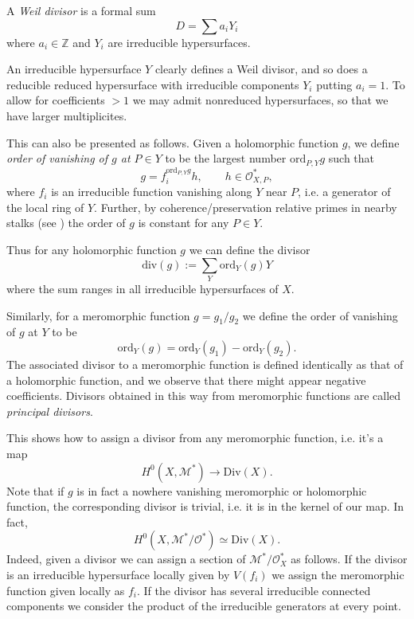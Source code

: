 \documentclass{book}
\begin{document}
\begin{definition}
\label{definition-divisor}
A {\it Weil divisor} is a formal sum
$$
D=\sum a_i Y_i
$$
where $a_i\in \mathbb{Z}$ and $Y_i$ are
irreducible hypersurfaces.
\end{definition}

\noindent
An irreducible hypersurface $Y$ clearly
defines a Weil divisor,
and so does a reducible reduced hypersurface
with irreducible
components $Y_i$ putting $a_i=1$.
To allow for coefficients $>1$ we may admit
nonreduced hypersurfaces,
so that we have larger multiplicites.

This can also be presented as follows.
Given a holomorphic function $g$, we define
{\it order of vanishing of $g$ at $P \in Y$}
to be the largest number $\text{ord}_{P,Y}g$
such that
$$
g=f_i^{\text{ord}_{P,Y}g}h,\qquad h \in
\mathcal{O}^*_{X,P},
$$
where $f_i$ is an irreducible function
vanishing along $Y$ near $P$,
i.e. a generator of the local ring of $Y$.
Further, by coherence/preservation relative
primes in nearby stalks
(see \cite[p. 696]{gri})
the order of $g$ is constant for any $P \in
Y$.

Thus for any holomorphic function $g$
we can define the divisor
$$
\text{div}(g):=\sum_{Y}\text{ord}_Y(g)Y
$$
where the sum ranges in all irreducible
hypersurfaces of $X$.

Similarly, for a meromorphic function
$g=g_1/g_2$
we define the order of vanishing of $g$ at
$Y$ to be
$$
\text{ord}_Y(g)=\text{ord}_Y(g_1)-\text{ord}
_Y(g_2).
$$
The associated divisor to a meromorphic
function
is defined identically as that of a
holomorphic function,
and we observe that there might appear
negative coefficients.
Divisors obtained in this way from
meromorphic functions
are called {\it principal divisors}.

This shows how to assign a divisor from any
meromorphic function,
i.e. it's a map
$$
H^0(X,\mathcal{M}^*) \to \text{Div}(X).
$$
Note that if $g$ is in fact a nowhere
vanishing meromorphic or
holomorphic function,
the corresponding divisor is trivial,
i.e. it is in the kernel of our map.
In fact,
$$
H^0(X,\mathcal{M}^*/\mathcal{O}^*) \simeq
\text{Div}(X).
$$
Indeed, given a divisor we can assign a
section of
$\mathcal{M}^*/\mathcal{O}_X^*$ as follows.
If the divisor is an irreducible hypersurface
locally given by $V(f_i)$
we assign the meromorphic function given
locally as $f_i$.
If the divisor has several irreducible
connected components
we consider the product of the irreducible
generators
at every point.
\end{document}
